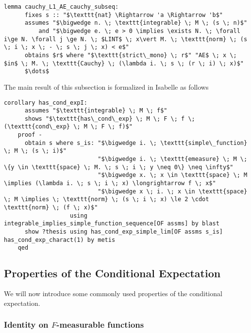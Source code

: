 \begin{isalemma}
{\small
	\begin{lstlisting}[style=isabelle]
	lemma cauchy_L1_AE_cauchy_subseq:
	  fixes s :: "$\texttt{nat} \Rightarrow 'a \Rightarrow 'b$"
	  assumes "$\bigwedge n. \; \texttt{integrable} \; M \; (s \; n)$"
		  and "$\bigwedge e. \; e > 0 \implies \exists N. \; \forall i\ge N. \forall j \ge N. \; $LINT$ \; x\vert M. \; \texttt{norm} \; (s \; i \; x \; - \; s \; j \; x) < e$"
	  obtains $r$ where "$\texttt{strict\_mono} \; r$" "AE$ \; x \; $in$ \; M. \; \texttt{Cauchy} \; (\lambda i. \; s \; (r \; i) \; x)$"
	  $\dots$
	\end{lstlisting}
}
\end{isalemma}


The main result of this subsection is formalized in Isabelle as follows

\begin{isacorollary}
{\small
	\begin{lstlisting}[style=isabelle]
	corollary has_cond_expI:
	  assumes "$\texttt{integrable} \; M \; f$"
	  shows "$\texttt{has\_cond\_exp} \; M \; F \; f \; (\texttt{cond\_exp} \; M \; F \; f)$"
	proof -
	  obtain s where s_is: "$\bigwedge i. \; \texttt{simple\_function} \; M \; (s \; i)$" 
	  					   "$\bigwedge i. \; \texttt{emeasure} \; M \; \{y \in \texttt{space} \; M. \; s \; i \; y \neq 0\} \neq \infty$" 
						   "$\bigwedge x. \; x \in \texttt{space} \; M \implies (\lambda i. \; s \; i \; x) \longrightarrow f \; x$" 
						   "$\bigwedge x \; i. \; x \in \texttt{space} \; M \implies \; \texttt{norm} \; (s \; i \; x) \le 2 \cdot \texttt{norm} \; (f \; x)$" 
				   using integrable_implies_simple_function_sequence[OF assms] by blast
	  show ?thesis using has_cond_exp_simple_lim[OF assms s_is] has_cond_exp_charact(1) by metis
	qed
	\end{lstlisting}
}
\end{isacorollary}

\subsection{Properties of the Conditional Expectation}

We will now introduce some commonly used properties of the conditional expectation.

\subsubsection{Identity on $F$-measurable functions}

